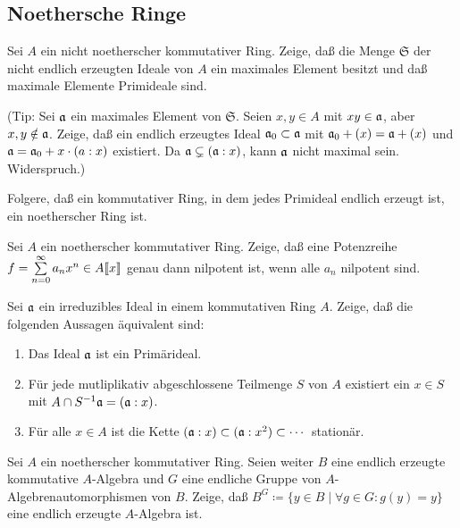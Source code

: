 \subsection{Noethersche Ringe}

\begin{exercise}
	Sei \(A\) ein nicht noetherscher kommutativer Ring. Zeige, daß die
	Menge \(\mathfrak S\) der nicht endlich erzeugten Ideale von \(A\)
	ein maximales Element besitzt und daß maximale Elemente Primideale sind.
	
	(Tip: Sei \(\mathfrak{a}\) ein maximales Element von \(\mathfrak S\). Seien
	\(x, y \in A\) mit \(xy \in \mathfrak{a}\), aber \(x, y \notin \mathfrak{a}\).
	Zeige, daß ein endlich erzeugtes Ideal \(\mathfrak{a}_0 \subset \mathfrak{a}\) mit
	\(\mathfrak{a}_0 + (x) = \mathfrak{a} + (x)\) und \(\mathfrak{a} = \mathfrak{a}_0 +
	x \cdot (a : x)\) existiert. Da \(\mathfrak{a} \subsetneq (\mathfrak{a} : x)\), kann
	\(\mathfrak{a}\) nicht maximal sein. Widerspruch.)
	
	Folgere, daß ein kommutativer Ring, in dem jedes Primideal endlich erzeugt
	ist, ein noetherscher Ring ist.
\end{exercise}

\begin{exercise}
	\label{exer:nilp_powerseries}
	Sei \(A\) ein noetherscher kommutativer Ring. Zeige, daß eine Potenzreihe
	\(f = \sum\limits_{n = 0}^\infty a_n x^n \in A\llbracket x\rrbracket\) genau dann nilpotent ist,
	wenn alle \(a_n\) nilpotent sind.
\end{exercise}

\begin{exercise}
	Sei \(\mathfrak{a}\) ein irreduzibles Ideal in einem kommutativen Ring \(A\).
	Zeige, daß die folgenden Aussagen äquivalent sind:
	\begin{enumerate}
	\item
		Das Ideal \(\mathfrak{a}\) ist ein Primärideal.
	\item
		Für jede mutliplikativ abgeschlossene Teilmenge \(S\) von \(A\)
		existiert ein \(x \in S\) mit \(A \cap S^{-1} \mathfrak{a} = (\mathfrak{a} : x)\).
	\item
		Für alle \(x \in A\) ist die Kette
		\((\mathfrak{a} : x) \subset (\mathfrak{a} : x^2) \subset \dotsb\)
		stationär.
	\end{enumerate}
\end{exercise}

\begin{exercise}
	Sei \(A\) ein noetherscher kommutativer Ring. Seien weiter \(B\) eine
	endlich erzeugte kommutative \(A\)-Algebra und \(G\) eine endliche Gruppe
	von \(A\)-Algebrenautomorphismen von \(B\). Zeige, daß
	\(B^G \coloneqq \{y \in B \mid \forall g \in G\colon g(y) = y\}\) eine
	endlich erzeugte \(A\)-Algebra ist.
\end{exercise}

